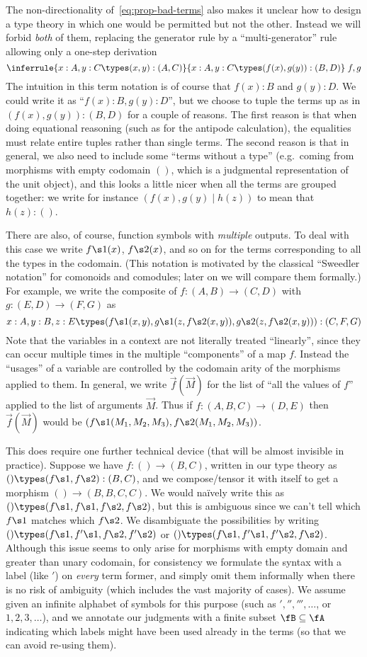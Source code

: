 The non-directionality of~\eqref{eq:prop-bad-terms} also makes it unclear how to design a type theory in which one would be permitted but not the other.
Instead we will forbid \emph{both} of them, replacing the generator rule by a ``multi-generator'' rule allowing only a one-step derivation
\[ \inferrule{x:A,y:C \types (x,y):(A,C)}{x:A,y:C \types (f(x),g(y)):(B,D)}\;f,g \]
The intuition in this term notation is of course that $f(x):B$ and $g(y):D$.
We could write it as ``$f(x):B,g(y):D$'', but we choose to tuple the terms up as in $(f(x),g(y)):(B,D)$ for a couple of reasons.
The first reason is that when doing equational reasoning (such as for the antipode calculation), the equalities must relate entire tuples rather than single terms.
The second reason is that in general, we also need to include some ``terms without a type'' (e.g.\ coming from morphisms with empty codomain $()$, which is a judgmental representation of the unit object), and this looks a little nicer when all the terms are grouped together: we write for instance $(f(x),g(y)\mid h(z))$ to mean that $h(z):()$.

There are also, of course, function symbols with \emph{multiple} outputs.
To deal with this case we write $f\s1(x)$, $f\s2(x)$, and so on for the terms corresponding to all the types in the codomain.
(This notation is motivated by the classical ``Sweedler notation'' for comonoids and comodules; later on we will compare them formally.)
For example, we write the composite of $f:(A,B) \to (C,D)$ with $g:(E,D)\to (F,G)$ as
\[ x:A, y:B, z:E \types (f\s1(x,y),g\s1(z,f\s2(x,y)),g\s2(z,f\s2(x,y))):(C,F,G) \]
Note that the variables in a context are not literally treated ``linearly'', since they can occur multiple times in the multiple ``components'' of a map $f$.
Instead the ``usages'' of a variable are controlled by the codomain arity of the morphisms applied to them.
In general, we write $\vec f(\vec M)$ for the list of ``all the values of $f$'' applied to the list of arguments $\vec M$.
Thus if $f:(A,B,C)\to (D,E)$ then $\vec f(\vec M)$ would be $(f\s1(M_1,M_2,M_3),f\s2(M_1,M_2,M_3))$.

This does require one further technical device (that will be almost invisible in practice).
Suppose we have $f:()\to (B,C)$, written in our type theory as $()\types (f\s1,f\s2):(B,C)$, and we compose/tensor it with itself to get a morphism $() \to (B,B,C,C)$.
We would na\"ively write this as $() \types (f\s1,f\s1,f\s2,f\s2)$, but this is ambiguous since we can't tell which $f\s1$ matches which $f\s2$.
We disambiguate the possibilities by writing $() \types (f\s1,f'\s1,f\s2,f'\s2)$ or $() \types (f\s1,f'\s1,f'\s2,f\s2)$.
Although this issue seems to only arise for morphisms with empty domain and greater than unary codomain, for consistency we formulate the syntax with a label (like $'$) on \emph{every} term former, and simply omit them informally when there is no risk of ambiguity (which includes the vast majority of cases).
We assume given an infinite alphabet of symbols \fA for this purpose (such as $','',''',\dots$, or $1,2,3,\dots$), and we annotate our judgments with a finite subset $\fB\subseteq \fA$ indicating which labels might have been used already in the terms (so that we can avoid re-using them).

